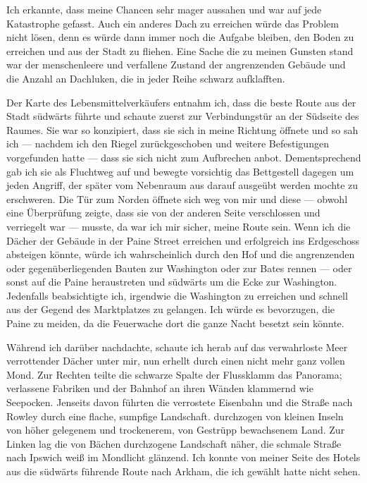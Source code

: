 Ich erkannte, dass meine Chancen sehr mager aussahen und war auf jede Katastrophe gefasst. Auch ein anderes Dach zu erreichen würde das Problem nicht lösen, denn es würde dann immer noch die Aufgabe bleiben, den Boden zu erreichen und aus der Stadt zu fliehen. Eine Sache die zu meinen Gunsten stand war der menschenleere und verfallene Zustand der angrenzenden Gebäude und die Anzahl an Dachluken, die in jeder Reihe schwarz aufklafften.

Der Karte des Lebensmittelverkäufers entnahm ich, dass die beste Route aus der Stadt südwärts führte und schaute zuerst zur Verbindungstür an der Südseite des Raumes. Sie war so konzipiert, dass sie sich in meine Richtung öffnete und so sah ich --- nachdem ich den Riegel zurückgeschoben und weitere Befestigungen vorgefunden hatte --- dass sie sich nicht zum Aufbrechen anbot. Dementsprechend gab ich sie als Fluchtweg auf und bewegte vorsichtig das Bettgestell dagegen um jeden Angriff, der später vom Nebenraum aus darauf ausgeübt werden mochte zu erschweren. Die Tür zum Norden öffnete sich weg von mir und diese --- obwohl eine Überprüfung zeigte, dass sie von der anderen Seite verschlossen und verriegelt war --- musste, da war ich mir sicher, meine Route sein. Wenn ich die Dächer der Gebäude in der Paine Street erreichen und erfolgreich ins Erdgeschoss absteigen könnte, würde ich wahrscheinlich durch den Hof und die angrenzenden oder gegenüberliegenden Bauten zur Washington oder zur Bates rennen --- oder sonst auf die Paine heraustreten und südwärts um die Ecke zur Washington. Jedenfalls beabsichtigte ich, irgendwie die Washington zu erreichen und schnell aus der Gegend des Marktplatzes zu gelangen. Ich würde es bevorzugen, die Paine zu meiden, da die Feuerwache dort die ganze Nacht besetzt sein könnte.

Während ich darüber nachdachte, schaute ich herab auf das verwahrloste Meer verrottender Dächer unter mir, nun erhellt durch einen nicht mehr ganz vollen Mond. Zur Rechten teilte die schwarze Spalte der Flussklamm das Panorama; verlassene Fabriken und der Bahnhof an ihren Wänden klammernd wie Seepocken. Jenseits davon führten die verrostete Eisenbahn und die Straße nach Rowley durch eine flache, sumpfige Landschaft. durchzogen von kleinen Inseln von höher gelegenem und trockenerem, von Gestrüpp bewachsenem Land. Zur Linken lag die von Bächen durchzogene Landschaft näher, die schmale Straße nach Ipswich weiß im Mondlicht glänzend. Ich konnte von meiner Seite des Hotels aus die südwärts führende Route nach Arkham, die ich gewählt hatte nicht sehen.

